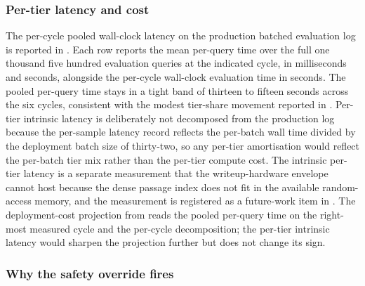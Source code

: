

\subsubsection{Per-tier latency and cost}
\label{sec:tier-cost}

The per-cycle pooled wall-clock latency on the production batched evaluation log is reported in . Each row reports the mean per-query time over the full one thousand five hundred evaluation queries at the indicated cycle, in milliseconds and seconds, alongside the per-cycle wall-clock evaluation time in seconds. The pooled per-query time stays in a tight band of thirteen to fifteen seconds across the six cycles, consistent with the modest tier-share movement reported in . Per-tier intrinsic latency is deliberately not decomposed from the production log because the per-sample latency record reflects the per-batch wall time divided by the deployment batch size of thirty-two, so any per-tier amortisation would reflect the per-batch tier mix rather than the per-tier compute cost. The intrinsic per-tier latency is a separate measurement that the writeup-hardware envelope cannot host because the dense passage index does not fit in the available random-access memory, and the measurement is registered as a future-work item in . The deployment-cost projection from  reads the pooled per-query time on the right-most measured cycle and the per-cycle decomposition; the per-tier intrinsic latency would sharpen the projection further but does not change its sign.



\subsubsection{Why the safety override fires}
\label{sec:tier-safety}

